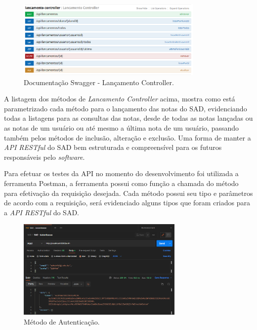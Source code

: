     \begin{figure}[h]
    \centering
    \includegraphics[width=0.81\textwidth]{./img/SwaggerLancamento.png}
    \caption{Documentação Swagger - Lançamento Controller.}
    \label{fig:SwaggerLancamento}
    \end{figure}
    
    A listagem dos métodos de \textit{Lancamento Controller} acima, mostra como está parametrizado cada método para o lançamento das notas do SAD, evidenciando todas a listagens para as consultas das notas, desde de todas as notas lançadas ou as notas de um usuário ou até mesmo a última nota de um usuário, passando também pelos métodos de inclusão, alteração e exclusão. Uma forma de manter a \textit{API RESTful} do SAD bem estruturada e compreensível para os futuros responsáveis pelo \textit{software}.
    
    Para efetuar os testes da API no momento do desenvolvimento foi utilizada a ferramenta Postman, a ferramenta possui como função a chamada do método para efetivação da requisição desejada. Cada método possui seu tipo e parâmetros  de acordo com a requisição, será evidenciado alguns tipos que foram criados para a \textit{API RESTful} do SAD.

    \begin{figure}[h]
    \centering
    \includegraphics[width=0.72\textwidth]{./img/ApiAutenticacao.png}
    \caption{Método de Autenticação.}
    \label{fig:ApiAutenticacao}
    \end{figure}

